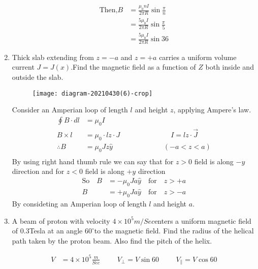 \begin{enumerate}[ label=\color{ocre}\textbf{\arabic*.}]
\begin{answer}
\begin{align*}
		\text{Then,} B&=\frac{\mu_0nI}{2\pi R}\sin\frac{\pi}{n}\\
		&=\frac{5\mu_0 I}{2\pi R}\sin\frac{\pi}{5}\\
		&=\frac{5\mu_0I}{2\pi R}\sin 36	
		\end{align*}
	\end{answer}
	\item Thick slab extending from $z=-a$ and $z=+a$ carries a uniform volume current $J=J(x) $.Find the magnetic field as a function of $Z$ both inside and outside the slab.
	\begin{figure}[H]
		\begin{center}
			\texttt{[image: diagram-20210430(6)-crop]}
		\end{center}
	\end{figure}
	\begin{answer}
		Consider an Amperian loop of length $l$ and height $z$, applying Ampere's law.\\
		\begin{align*}
		\oint B\cdot dl&=\mu_0I\\
		B\times l&=\mu_0\cdot lz\cdot J\hspace{3cm}I=lz\cdot \vec{J}\\
		\therefore B&=\mu_0Jz\hat{y}\hspace{3cm}(-a<z<a)\\
		\end{align*}
		By using right hand thumb rule we can say that for $z>0$ field is along $-y$ direction and for $z<0$ field is along $+y$ direction
		\begin{align*}
		\text{So}\quad B&=-\mu_0Ja\hat{y}\quad\text{for}\quad z>+a\\
		B&=+\mu_0Ja\hat{y}\quad\text{for}\quad z>-a
		\end{align*}
		By consideting an Amperian loop of length $l$ and height $a$.
	\end{answer}
	\item A beam of proton with velocity $4\times10^5 {m}/{Sec}$enters a uniform magnetic field of 0.3Tesla at an angle $60^\circ$to the magnetic field. Find the radius of the helical path taken by the proton beam. Also find the pitch of the helix.\\
	\begin{answer}
		\begin{align*}
		V&=4\times10^5 \frac{m}{Sec}\hspace{1cm}V_\perp=V\sin60\hspace{1cm}V_\parallel=V\cos60\\

\end{align*}
\end{answer}
\end{enumerate}
